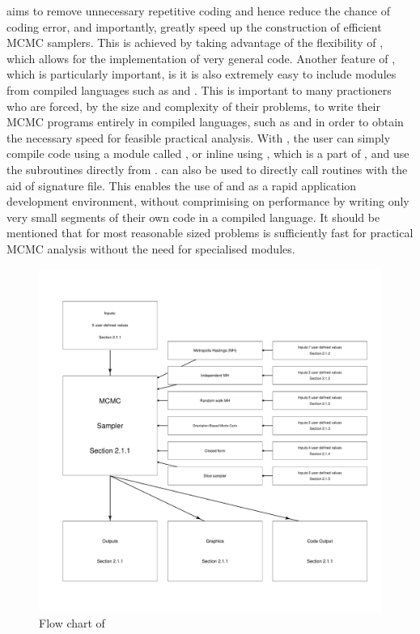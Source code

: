 \documentclass[article]{jss}
\begin{document}
 aims to remove unnecessary repetitive coding and hence
reduce the chance of coding error, and importantly, greatly speed up
the construction of efficient MCMC samplers. This is achieved by
taking advantage of the flexibility of , which allows
for the implementation of very general code. Another feature of
, which is particularly important, is it is also
extremely easy to include modules from compiled languages such as
 and . This is important to many
practioners who are forced, by the size and complexity of their
problems, to write their MCMC programs entirely in compiled languages,
such as  and  in order to obtain the
necessary speed for feasible practical analysis. With
, the user can simply compile  code
using a module called  \citep{F2PY}, or inline 
using , which is a part of  \citep{NumpyScipy},
and use the subroutines directly from . 
can also be used to directly call  routines with the aid
of  signature file. This enables the use of
 and  as a rapid application development
environment, without comprimising on performance by writing only very
small segments of their own code in a compiled language. It should be
mentioned that for most reasonable sized problems  is
sufficiently fast for practical MCMC analysis without the need for
specialised modules.

%
\begin{figure}[H]
  \begin{center}
\hspace*{-1cm}\includegraphics[width=18cm]{flowchart.pdf}    
  \end{center}
\caption{Flow chart of \label{fig:Flow-chart-ofPyMCMC}}

\end{figure}
\end{document}
